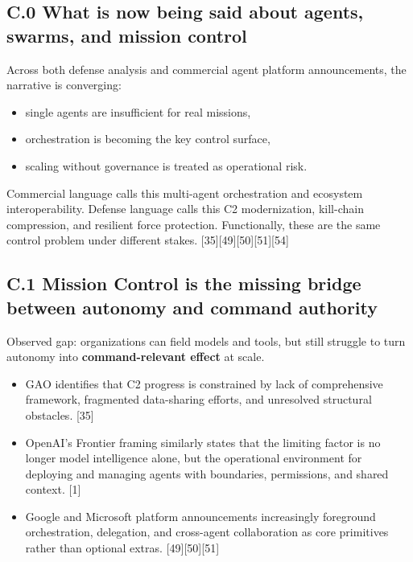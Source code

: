 \documentclass[
]{article}
\providecommand{\tightlist}{%
  \setlength{\itemsep}{0pt}\setlength{\parskip}{0pt}}
\begin{document}
\hypertarget{c.0-what-is-now-being-said-about-agents-swarms-and-mission-control}{%
\subsection{C.0 What is now being said about agents, swarms, and mission
control}\label{c.0-what-is-now-being-said-about-agents-swarms-and-mission-control}}

Across both defense analysis and commercial agent platform
announcements, the narrative is converging:

\begin{itemize}
\tightlist
\item
  single agents are insufficient for real missions,
\item
  orchestration is becoming the key control surface,
\item
  scaling without governance is treated as operational risk.
\end{itemize}

Commercial language calls this multi-agent orchestration and ecosystem
interoperability. Defense language calls this C2 modernization,
kill-chain compression, and resilient force protection. Functionally,
these are the same control problem under different stakes.
{[}35{]}{[}49{]}{[}50{]}{[}51{]}{[}54{]}

\hypertarget{c.1-mission-control-is-the-missing-bridge-between-autonomy-and-command-authority}{%
\subsection{C.1 Mission Control is the missing bridge between autonomy
and command
authority}\label{c.1-mission-control-is-the-missing-bridge-between-autonomy-and-command-authority}}

Observed gap: organizations can field models and tools, but still
struggle to turn autonomy into \textbf{command-relevant effect} at
scale.

\begin{itemize}
\tightlist
\item
  GAO identifies that C2 progress is constrained by lack of
  comprehensive framework, fragmented data-sharing efforts, and
  unresolved structural obstacles. {[}35{]}
\item
  OpenAI's Frontier framing similarly states that the limiting factor is
  no longer model intelligence alone, but the operational environment
  for deploying and managing agents with boundaries, permissions, and
  shared context. {[}1{]}
\item
  Google and Microsoft platform announcements increasingly foreground
  orchestration, delegation, and cross-agent collaboration as core
  primitives rather than optional extras. {[}49{]}{[}50{]}{[}51{]}
\end{itemize}
\end{document}
